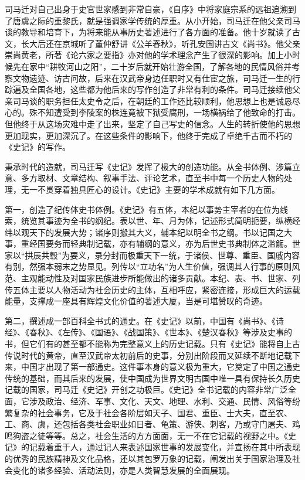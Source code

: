 \documentclass[12pt,UTF8]{ctexbook}
\begin{document}
司马迁对自己出身于史官世家感到非常自豪，《自序》中将家庭宗系的远祖追溯到了唐虞之际的重黎氏，就是强调家学传统的厚重。从小开始，司马迁在他父亲司马谈的教导和培育下，为将来能从事历史著述进行了各方面的准备。他十岁就读了古文，长大后还在京城听了董仲舒讲《公羊春秋》，听孔安国讲古文《尚书》。他父亲崇尚黄老，所著《论六家之要指》亦对他的学术理念产生了很深的影响。加上小时候先在家中“耕牧河山之阳”，二十岁后就开始壮游全国，了解各地的民情风俗并考察文物遗迹、访古问故，后来在汉武帝身边任职时又有仕宦之旅，司马迁一生的行踪遍及全国各地，这些都为他后来的写作创造了非常有利的条件。司马迁接续他父亲司马谈的职务担任太史令之后，在朝廷的工作还比较顺利，他思想上也是诚恳尽心的。殊不知遭受到李陵案的株连竟被下狱受腐刑，一场横祸给了他致命的打击。但他终于从这场灾难中走了出来，坚定了自己写史的信念。人生的转折使他的思想更加现实，更加深沉了。在这些条件的影响下，他终于完成了卓绝千古而不朽的《史记》的写作。

秉承时代的造就，司马迁写《史记》发挥了极大的创造功能。从全书体例、涉篇立意、多方取材、文章结构、叙事手法、评论艺术，直至书中每一个历史人物的处理，无一不贯穿着独具匠心的设计。《史记》主要的学术成就有如下几方面。

第一，创造了纪传体史书体例。《史记》有五体，本纪以事势主宰者的在位为线索，统览其事迹为全书的纲纪。表以世、年、月为体，记述形式简明扼要，纵横经纬以观天下的发展大势；诸序则搬其大义，辅本纪以明全书之纲。书以记国之大事，重经国要务而轻典制记载，亦有辅纲的意义，亦为后世史书典制体之滥觞。世家以“拱辰共毂”为要义，录分封而极重天下一统，于诸侯、世尊、重臣、国戚内容有别，然强本弱末之势显见。列传以“立功名”为人生价值，强调其人行事的原则风范、主观能动性及对国家民族进步所能做出的诸多贡献。本纪、表、书、世家、列传五体主要以人物活动为社会历史的主体，互相呼应，紧密连接，形成巨大的运载能量，支撑成一座具有辉煌文化价值的著述大厦，当是可堪赞叹的奇迹。

第二，撰述成一部百科全书式的通史。在《史记》以前，中国有《尚书》、《诗经》、《春秋》、《左传》、《国语》、《战国策》、《世本》、《楚汉春秋》等涉及史事的书，但它们有的甚至都不能称为完整意义上的历史记载。只有《史记》能将自上古传说时代的黄帝，直至汉武帝太初前后的史事，分别出阶段而又延续不断地记载下来，中国才出现了第一部通史。这件事本身的意义极为重大，它奠定了中国之通史传统的基础，而其后来的发展，使中国成为世界文明古国中唯一具有保持长久历史记载的国家，司马迁《史记》开创之功极巨。《史记》全书记载的内容非常广泛全面，它涉及政治、经济、军事、文化、天文、地理、水利、交通、民情、风俗等纷繁复杂的社会事务，它及于社会各阶层如天子、国君、重臣、士大夫，直至农、工、商、虞，还包括各类社会职业如日者、龟策、游侠、刺客，乃或守门屠夫、鸡鸣狗盗之徒等等。总之，社会生活的方方面面，无一不在它记载的视野之中。《史记》的记载着重于人，通过记人来表述国家世事的发展变化，并宣扬在其中所表现的优秀的民族精神及文化品格，还以其包罗万象的记载，阐发出关于国家治理及社会变化的诸多经验、活动法则，亦是人类智慧发展的全面展现。
\end{document}
